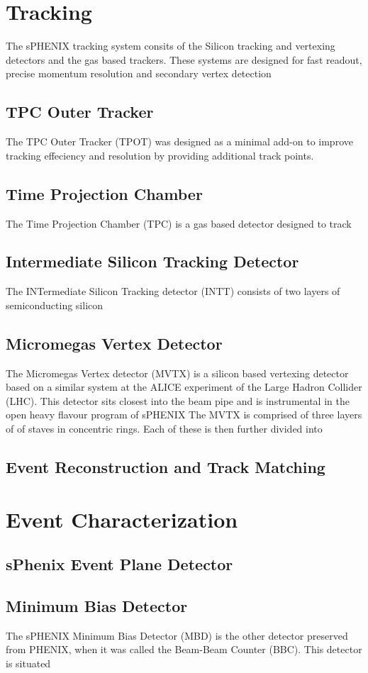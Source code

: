 \documentclass[letterpaper, 12pt, oneside]{book}
\theoremstyle{definition}
\begin{document}
\section{Tracking}
	The sPHENIX tracking system consits of the Silicon tracking and vertexing detectors and the gas based trackers.
	These systems are designed for fast readout, precise momentum resolution and secondary vertex detection
	\subsection{TPC Outer Tracker}
	The TPC Outer Tracker (TPOT) was designed as a minimal add-on to improve tracking effeciency and resolution by providing additional track points. 
	\subsection{Time Projection Chamber}
	The Time Projection Chamber (TPC) is a gas based detector designed to track 
	\subsection{Intermediate Silicon Tracking Detector}
	The INTermediate Silicon Tracking detector (INTT) consists of two layers of semiconducting silicon 
	\subsection{Micromegas Vertex Detector}
	The Micromegas Vertex detector (MVTX) is a silicon based vertexing detector based on a similar system at the ALICE experiment of the Large Hadron Collider (LHC).
	This detector sits closest into the beam pipe and is instrumental in the open heavy flavour program of sPHENIX \cite {sPHENIX_TDR}
	The MVTX is comprised of three layers of%
	of staves in concentric rings. 
	Each of these is then further divided into 
	\subsection{Event Reconstruction and Track Matching}
	\label{sec:events}
\section{Event Characterization}
	\subsection{sPhenix Event Plane Detector}
	\subsection{Minimum Bias Detector}
	The sPHENIX Minimum Bias Detector (MBD) is the other detector preserved from PHENIX, when it was called the Beam-Beam Counter (BBC). 
	This detector is situated  
\end{document}
